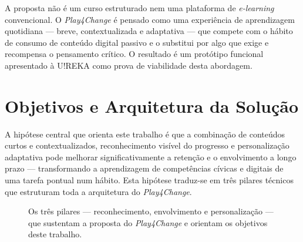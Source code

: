 A proposta não é um curso estruturado nem uma plataforma de \emph{e-learning} convencional. O \emph{Play4Change} é pensado como uma experiência de aprendizagem quotidiana --- breve, contextualizada e adaptativa --- que compete com o hábito de consumo de conteúdo digital passivo e o substitui por algo que exige e recompensa o pensamento crítico. O resultado é um protótipo funcional apresentado à U!REKA como prova de viabilidade desta abordagem.

\section{Objetivos e Arquitetura da Solução}
\label{sec:objetivos-pilares}

A hipótese central que orienta este trabalho é que a combinação de conteúdos curtos e contextualizados, reconhecimento visível do progresso e personalização adaptativa pode melhorar significativamente a retenção e o envolvimento a longo prazo --- transformando a aprendizagem de competências cívicas e digitais de uma tarefa pontual num hábito. Esta hipótese traduz-se em três pilares técnicos que estruturam toda a arquitetura do \emph{Play4Change}.

\begin{figure}[htbp]
	\centering
	\caption[Os três pilares do Play4Change]{Os três pilares --- reconhecimento, envolvimento e personalização --- que sustentam a proposta do \emph{Play4Change} e orientam os objetivos deste trabalho.}
	\label{fig:tres-pilares}
\end{figure}

